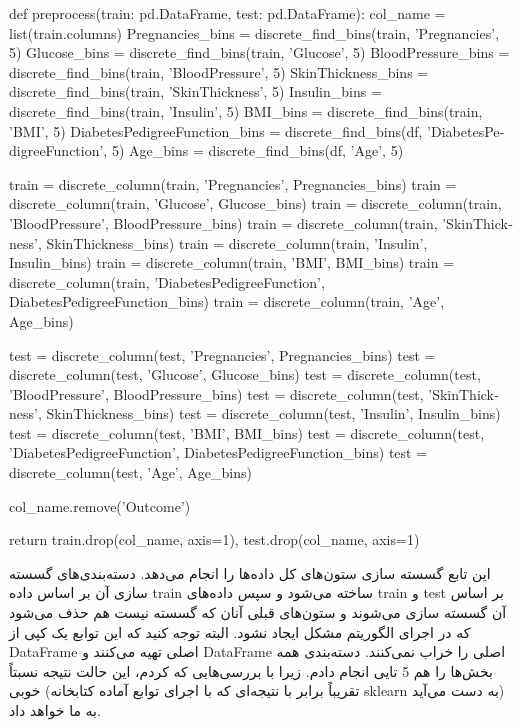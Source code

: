 \documentclass[12pt,titlepage,a4page , tikz , multi,table , svgnames,xcdraw]{article}
\begin{document}
  \begin{latin}
\begin{python}[language=Python]



def preprocess(train: pd.DataFrame, test: pd.DataFrame):
    col_name = list(train.columns)
    Pregnancies_bins = discrete_find_bins(train, 'Pregnancies', 5)
    Glucose_bins = discrete_find_bins(train, 'Glucose', 5)
    BloodPressure_bins = discrete_find_bins(train, 'BloodPressure', 5)
    SkinThickness_bins = discrete_find_bins(train, 'SkinThickness', 5)
    Insulin_bins = discrete_find_bins(train, 'Insulin', 5)
    BMI_bins = discrete_find_bins(train, 'BMI', 5)
    DiabetesPedigreeFunction_bins = discrete_find_bins(df,
     'DiabetesPedigreeFunction', 5)
    Age_bins = discrete_find_bins(df, 'Age', 5)

    train = discrete_column(train, 'Pregnancies', Pregnancies_bins)
    train = discrete_column(train, 'Glucose', Glucose_bins)
    train = discrete_column(train, 'BloodPressure', BloodPressure_bins)
    train = discrete_column(train, 'SkinThickness', SkinThickness_bins)
    train = discrete_column(train, 'Insulin', Insulin_bins)
    train = discrete_column(train, 'BMI', BMI_bins)
    train = discrete_column(train,
     'DiabetesPedigreeFunction', DiabetesPedigreeFunction_bins)
    train = discrete_column(train, 'Age', Age_bins)

    test = discrete_column(test, 'Pregnancies', Pregnancies_bins)
    test = discrete_column(test, 'Glucose', Glucose_bins)
    test = discrete_column(test, 'BloodPressure', BloodPressure_bins)
    test = discrete_column(test, 'SkinThickness', SkinThickness_bins)
    test = discrete_column(test, 'Insulin', Insulin_bins)
    test = discrete_column(test, 'BMI', BMI_bins)
    test = discrete_column(test,
     'DiabetesPedigreeFunction', DiabetesPedigreeFunction_bins)
    test = discrete_column(test, 'Age', Age_bins)

    col_name.remove('Outcome')

    return train.drop(col_name, axis=1), test.drop(col_name, axis=1)


\end{python}

\end{latin}

این تابع گسسته سازی ستون‌های کل داده‌ها را انجام می‌دهد. دسته‌بندی‌های گسسته سازی آن بر اساس داده train ساخته می‌شود و سپس داده‌های train و test بر اساس آن گسسته سازی می‌شوند و ستون‌های قبلی آنان که گسسته نیست هم حذف می‌شود که در اجرای الگوریتم مشکل ایجاد نشود. البته توجه کنید که این توابع یک کپی از DataFrame اصلی تهیه می‌کنند و DataFrame اصلی را خراب نمی‌کنند. دسته‌بندی همه بخش‌ها را هم 5 تایی انجام دادم. زیرا با بررسی‌هایی که کردم، این حالت نتیجه نسبتاً خوبی (تقریباً برابر با نتیجه‌ای که با اجرای توابع آماده کتابخانه sklearn به دست می‌آید) به ما خواهد داد.
\end{document}
